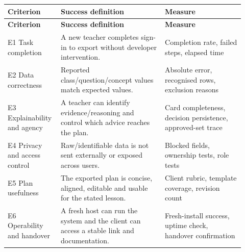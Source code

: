 \documentclass[11pt,a4paper]{article}
\begin{document}
\begin{small}

\setlength{\tabcolsep}{3pt}

\begin{longtable}{>{\raggedright\arraybackslash}p{0.172\linewidth}>{\raggedright\arraybackslash}p{0.423\linewidth}>{\raggedright\arraybackslash}p{0.325\linewidth}}

\hline

\textbf{Criterion} & \textbf{Success definition} & \textbf{Measure} \\ \hline

\endfirsthead

\hline

\textbf{Criterion} & \textbf{Success definition} & \textbf{Measure} \\ \hline

\endhead

E1 Task completion & A new teacher completes sign-in to export without developer intervention. & Completion rate, failed steps, elapsed time \\ \hline

E2 Data correctness & Reported class/\allowbreak{}question/\allowbreak{}concept values match expected values. & Absolute error, recognised rows, exclusion reasons \\ \hline

E3 Explainability and agency & A teacher can identify evidence/\allowbreak{}reasoning and control which advice reaches the plan. & Card completeness, decision persistence, approved-set trace \\ \hline

E4 Privacy and access control & Raw/\allowbreak{}identifiable data is not sent externally or exposed across users. & Blocked fields, ownership tests, role tests \\ \hline

E5 Plan usefulness & The exported plan is concise, aligned, editable and usable for the stated lesson. & Client rubric, template coverage, revision count \\ \hline

E6 Operability and handover & A fresh host can run the system and the client can access a stable link and documentation. & Fresh-install success, uptime check, handover confirmation \\ \hline

\end{longtable}

\end{small}
\end{document}
